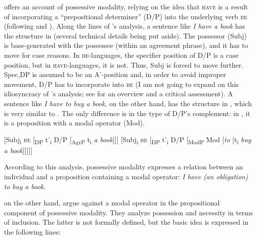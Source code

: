 \documentclass[output=paper,colorlinks,citecolor=brown,modfonts,nonflat]{langsci/langscibook}
\begin{document}
\citet{Bhatt1997} offers an account of possessive modality, relying on the idea that \textsc{have} is a result of incorporating a “prepositional determiner” (D/P) into the underlying verb \textsc{be} (following \citealt{Freeze1992} and \citealt{Kayne1993}). Along the lines of \citeauthor{Kayne1993}’s analysis, a sentence like \textit{I have a book} has the structure in  (several technical details being put aside). The possessor (Subj) is base-generated with the possessee (within an agreement phrase), and it has to move for case reasons. In \textsc{be}{}-languages, the specifier position of D/P is a case position, but in \textsc{have-}languages, it is not. Thus, Subj is forced to move further. Spec,DP is assumed to be an A'{}-position and, in order to avoid improper movement, D/P has to incorporate into \textsc{be} (I am not going to expand on this idiosyncrasy of \citeauthor{Kayne1993}’s analysis; see \citealt[320–328]{Myler2016} for an overview and a critical assessment). A sentence like \textit{I have to buy a book}, on the other hand, has the structure in , which is very similar to . The only difference is in the type of D/P’s complement: in , it is a proposition with a modal operator (Mod).

\ea%
    \label{ex:tsedryk:2}
    \ea\label{ex:tsedryk:2a}{}
    [Subj\textsubscript{i} \textsc{be} [\textsubscript{DP} t'\textsubscript{i} D/P [\textsubscript{AgrP} t\textsubscript{i} \textit{a book}]]]
    \ex\label{ex:tsedryk:2b}{}
    [Subj\textsubscript{i} \textsc{be} [\textsubscript{DP} t'\textsubscript{i} D/P [\textsubscript{ModP} Mod [\textit{to} [t\textsubscript{i} \textit{buy a book}]]]]]
    \z
\z

According to this analysis, possessive modality expresses a relation between an individual and a proposition containing a modal operator: \textit{I have (an obligation) to buy a book}.

\citet{BjorkmanCowper2016} on the other hand, argue against a modal operator in the propositional component of possessive modality. They analyze possession and necessity in terms of inclusion. The latter is not formally defined, but the basic idea is expressed in the following lines:
\end{document}
